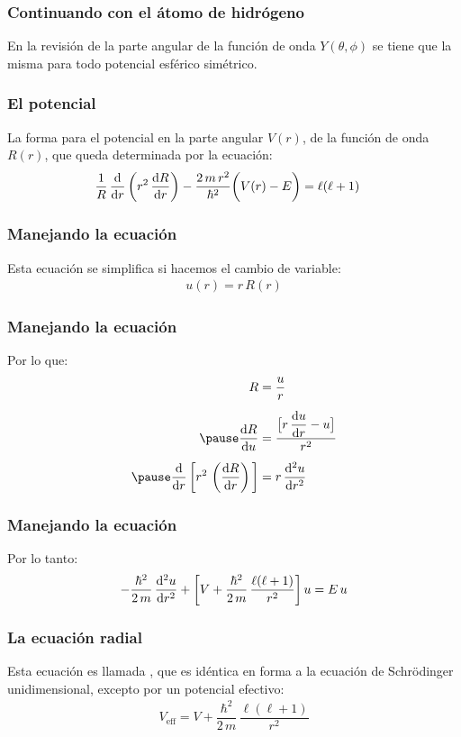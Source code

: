 \documentclass[12pt]{beamer}
\begin{document}
\begin{frame}
\frametitle{Continuando con el átomo de hidrógeno}
En la revisión de la parte angular de la función de onda $Y (\theta, \phi)$ se tiene que la misma para todo potencial esférico simétrico.
\end{frame}
\begin{frame}
\frametitle{El potencial}
La forma para el potencial en la parte angular $V (r)$,  de la función de onda $R (r)$, que queda determinada por la ecuación:
\pause
\begin{align*}
\dfrac{1}{R} \, \dv{r} \left( r^{2} \, \dv{R}{r} \right) - \dfrac{2 \, m \, r^{2}}{\hbar^{2}} \bigg( V(r) - E \bigg) &= \ell (\ell + 1)
\end{align*}
\end{frame}
\begin{frame}
\frametitle{Manejando la ecuación}
Esta ecuación se simplifica si hacemos el cambio de variable:
\pause
\begin{align}
u (r) = r \, R (r)
\label{eq:ecuacion_04_36}
\end{align}
\end{frame}
\begin{frame}
\frametitle{Manejando la ecuación}
Por lo que:
\pause
\begin{eqnarray*}
\begin{aligned}
    R &= \dfrac{u}{r} \\[0.5em] \pause
    \dv{R}{u} &= \dfrac{ \big[ r \, \displaystyle \dv{u}{r} - u \big]}{r^{2}} \\[0.5em] \pause
    \dv{r} \, \bigg[ r^{2} \, \left( \dv{R}{r} \right) \bigg] &= r \, \dv[2]{u}{r}
\end{aligned}
\end{eqnarray*}
\end{frame}
\begin{frame}
\frametitle{Manejando la ecuación}
Por lo tanto:
\pause
\begin{align}
- \dfrac{\hbar^{2}}{2 \, m} \, \dv[2]{u}{r} + \bigg[ V + \dfrac{\hbar^{2}}{2 \, m} \,\dfrac{\ell (\ell + 1)}{r^{2}} \bigg] \, u =  E \, u
\label{eq:ecuacion_04_37}
\end{align}
\end{frame}
\begin{frame}
\frametitle{La ecuación radial}
Esta ecuación es llamada , que es idéntica en forma a la ecuación de Schrödinger unidimensional, excepto por un potencial efectivo:
\pause
\begin{align}
V_{\text{eff}} = V + \dfrac{\hbar^{2}}{2 \, m} \,\dfrac{\ell (\ell + 1)}{r^{2}}
\label{eq:ecuacion_04_38}
\end{align}
\end{frame}
\end{document}
